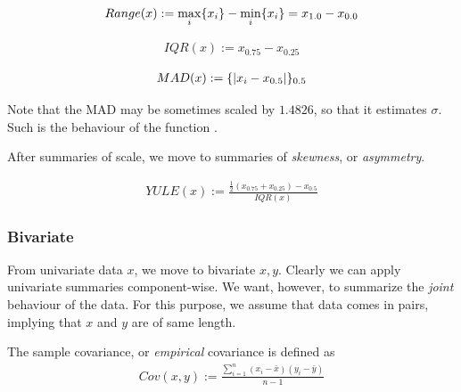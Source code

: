 \begin{definition}
\begin{align}
	Range(x):= \max_i\{ x_i \}-\min_i\{ x_i \}= x_{1.0}-x_{0.0}
\end{align}
\end{definition}

\begin{definition}
\label{def:iqr}
\begin{align}
	IQR(x):= x_{0.75}-x_{0.25}
\end{align}
\end{definition}



\begin{definition}
\label{def:mad}
\begin{align}
	MAD(x):= \{ |x_i-x_{0.5}| \}_{0.5} 
\end{align}
\end{definition}
Note that the MAD may be sometimes scaled by $1.4826$, so that it estimates $\sigma$. Such is the behaviour of the \R function . 


After summaries of scale, we move to summaries of \emph{skewness}, or \emph{asymmetry}.

\begin{definition}
\begin{align}
	YULE(x):= \frac{\frac{1}{2} (x_{0.75}+x_{0.25})-x_{0.5}}{IQR(x)}
\end{align}
\end{definition}

 


\subsubsection{Bivariate}
From univariate data $x$, we move to bivariate $x,y$.
Clearly we can apply univariate summaries component-wise. 
We want, however, to summarize the \emph{joint} behaviour of the data. 
For this purpose, we assume that data comes in pairs, implying that $x$ and $y$ are of same length.


\begin{definition}[Covariance]
The sample covariance, or \emph{empirical} covariance is defined as
\begin{align}
	Cov(x,y):= \frac{\sum_{i=1}^{n} (x_i-\bar{x})(y_i-\bar{y})}{n-1}
\end{align}
\end{definition}



